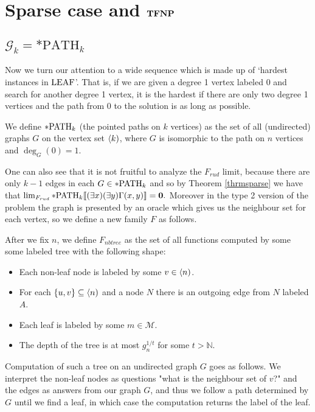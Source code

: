 \chapter{Sparse case and $\textbf{TFNP}$}\label{chapsparse}

\section{$\mathcal{G}_k=*\text{PATH}_k$}

Now we turn our attention to a wide sequence which is made up of `hardest instances in $\text{LEAF}$'. That is, if we are given a degree 1 vertex labeled $0$ and search for another degree 1 vertex, it is the hardest if there are only two degree 1 vertices and the path from $0$ to the solution is as long as possible.

\begin{defi}
We define $*\text{PATH}_k$ (the pointed paths on $k$ vertices) as the set of all (undirected) graphs $G$ on the vertex set $\langle k)$, where $G$ is isomorphic to the path on $n$ vertices and $\deg_G(0)=1$.
\end{defi}

One can also see that it is not fruitful to analyze the $F_{rud}$ limit, because there are only $k-1$ edges in each $G\in*\text{PATH}_k$ and so by Theorem \ref{thrmsparse} we have that $\lim_{F_{rud}}*\text{PATH}_k\llbracket(\exists x)(\exists y)\Gamma(x,y)\rrbracket=\textbf{0}.$ Moreover in the type 2 version of the problem the graph is presented by an oracle which gives us the neighbour set for each vertex, so we define a new family $F$ as follows.

\begin{defi}
After we fix $n$, we define $F_{nbtree}$ as the set of all functions computed by some some labeled tree with the following shape:

\begin{itemize}
\item Each non-leaf node is labeled by some $v\in\langle n)$. 
\item For each $\{u,v\} \subseteq \langle n)$ and a node $N$ there is an outgoing edge from $N$ labeled $A$.
\item Each leaf is labeled by some $m\in \mathcal{M}$.
\item The depth of the tree is at most $g_n^{1/t}$ for some $t>\mathbb{N}$.
\end{itemize}

Computation of such a tree on an undirected graph $G$ goes as follows. We interpret the non-leaf nodes as questions "what is the neighbour set of $v$?" and the edges as answers from our graph $G$, and thus we follow a path determined by $G$ until we find a leaf, in which case the computation returns the label of the leaf.
\end{defi}

